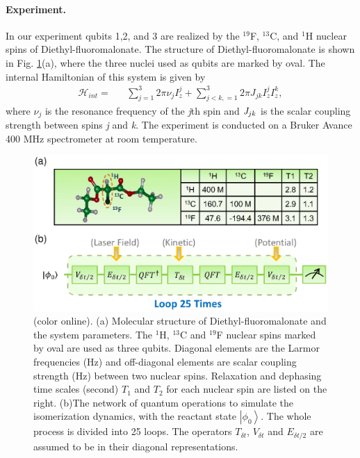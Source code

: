 \documentclass[prl,twocolumn,showpacs]{revtex4}
\begin{document}
\paragraph*{Experiment.}

In our experiment qubits 1,2, and 3 are realized by the $^{19}$F, $^{13}$C, and $^1$H nuclear spins of Diethyl-fluoromalonate.  The structure of Diethyl-fluoromalonate is shown in Fig. \ref{structure}(a), where the three nuclei used as qubits are marked by oval. The internal Hamiltonian of this system is given by
\begin{eqnarray}\label{Hamiltonian}
\mathcal{H}_{int}=&&\sum\limits_{j=1}^3 {2\pi \nu _j } I_z^j  + \sum\limits_{j < k,=1}^3 {2\pi} J_{jk} I_z^j I_z^k,
\end{eqnarray}
where $\nu_j$ is the resonance frequency of the \emph{j}th spin and
$\emph{J}_{jk}$ is the scalar coupling strength between spins \emph{j} and
\emph{k}. The experiment is conducted on a Bruker Avance 400 MHz spectrometer at room temperature.

\begin{figure}[htb]
\begin{center}
\hspace{-0.5cm}\includegraphics[width= 0.9\columnwidth]{structure.eps}
\end{center}
\setlength{\abovecaptionskip}{-0.35cm}
\caption{\footnotesize{(color online). (a) Molecular structure of Diethyl-fluoromalonate and the system parameters.
The $^1$H, $^{13}$C and $^{19}$F nuclear spins marked by oval are used as three qubits.
Diagonal elements are the Larmor frequencies (Hz) and
off-diagonal elements are scalar coupling strength (Hz) between two nuclear spins.
Relaxation and dephasing time scales (second) $T_1$ and $T_2$ for each nuclear spin are listed on the right.
(b)The network of quantum operations to simulate the isomerization dynamics, with the reactant state $\left\vert \phi_{0} \right\rangle$.
The whole process is divided into 25 loops. The operators $T_{\delta t}$, $V_{\delta t}$ and $E_{\delta t/2}$ are assumed to be in their
diagonal representations.}}\label{structure}
\end{figure}
\end{document}

